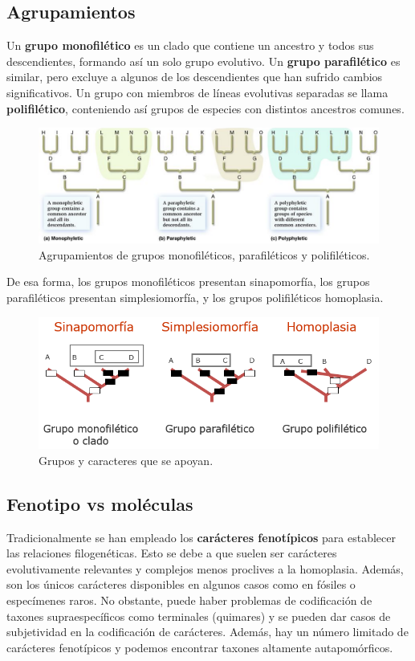 \subsection{Agrupamientos}
Un \textbf{grupo monofilético} es un clado que contiene un ancestro y todos sus descendientes, formando así un solo grupo evolutivo. Un \textbf{grupo parafilético} es similar, pero excluye a algunos de los descendientes que han sufrido cambios significativos. Un grupo con miembros de líneas evolutivas separadas se llama \textbf{polifilético}, conteniendo así grupos de especies con distintos ancestros comunes. 

\begin{figure}[htbp]
\centering
\includegraphics[width=0.5\linewidth]{figs/agrupamientos.png}
\caption{Agrupamientos de grupos monofiléticos, parafiléticos y polifiléticos.}
\end{figure}

De esa forma, los grupos monofiléticos presentan sinapomorfía, los grupos parafiléticos presentan simplesiomorfía, y los grupos polifiléticos homoplasia. 

\begin{figure}[htbp]
\centering
\includegraphics[width=0.5\linewidth]{figs/homoplasia-agrupamientos.png}
\caption{Grupos y caracteres que se apoyan.}
\end{figure}

\subsection{Fenotipo vs moléculas}
Tradicionalmente se han empleado los \textbf{carácteres fenotípicos} para establecer las relaciones filogenéticas. Esto se debe a que suelen ser carácteres evolutivamente relevantes y complejos menos proclives a la homoplasia. Además, son los únicos carácteres disponibles en algunos casos como en fósiles o especímenes raros. No obstante, puede haber problemas de codificación de taxones supraespecíficos como terminales (quimares) y se pueden dar casos de subjetividad en la codificación de carácteres. Además, hay un número limitado de carácteres fenotípicos y podemos encontrar taxones altamente autapomórficos. 

